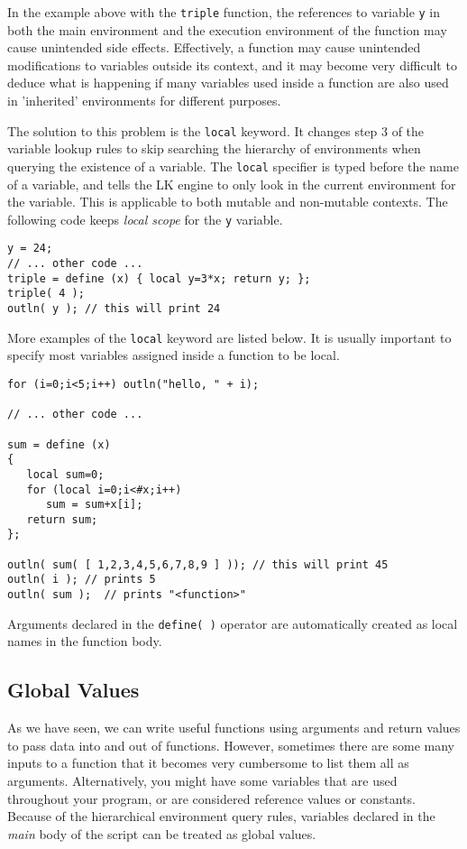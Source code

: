 \documentclass{article}
\begin{document}
In the example above with the \texttt{triple} function, the references to variable \texttt{y} in both the main environment and the execution environment of the function may cause unintended side effects.  Effectively, a function may cause unintended modifications to variables outside its context, and it may become very difficult to deduce what is happening if many variables used inside a function are also used in 'inherited' environments for different purposes.

The solution to this problem is the \texttt{local} keyword.  It changes step 3 of the variable lookup rules to skip searching the hierarchy of environments when querying the existence of a variable.  The \texttt{local} specifier is typed before the name of a variable, and tells the LK engine to only look in the current environment for the variable.  This is applicable to both mutable and non-mutable contexts.  The following code keeps \emph{local scope} for the \texttt{y} variable.

\begin{verbatim}
y = 24;
// ... other code ...
triple = define (x) { local y=3*x; return y; };
triple( 4 );
outln( y ); // this will print 24
\end{verbatim}

More examples of the \texttt{local} keyword are listed below.  It is usually important to specify most variables assigned inside a function to be local.  


\begin{verbatim}
for (i=0;i<5;i++) outln("hello, " + i);

// ... other code ...

sum = define (x) 
{ 
   local sum=0;
   for (local i=0;i<#x;i++)
      sum = sum+x[i];
   return sum;
};

outln( sum( [ 1,2,3,4,5,6,7,8,9 ] )); // this will print 45
outln( i ); // prints 5
outln( sum );  // prints "<function>"
\end{verbatim}

Arguments declared in the \texttt{define( )} operator are automatically created as local names in the function body.

\subsection{Global Values}
As we have seen, we can write useful functions using arguments and return values to pass data into and out of functions.  However, sometimes there are some many inputs to a function that it becomes very cumbersome to list them all as arguments.  Alternatively, you might have some variables that are used throughout your program, or are considered reference values or constants.  Because of the hierarchical environment query rules, variables declared in the \emph{main} body of the script can be treated as global values.
\end{document}
